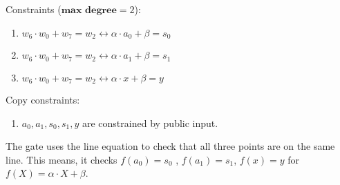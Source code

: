 Constraints ($\textbf{max degree} = 2$):
\begin{enumerate}
    \item $w_6 \cdot w_0 + w_7 = w_2 \longleftrightarrow 
            \alpha \cdot a_0 + \beta = s_0$
    \item $w_6 \cdot w_0 + w_7 = w_2 \longleftrightarrow 
            \alpha \cdot a_1 + \beta = s_1$
    \item $w_6 \cdot w_0 + w_7 = w_2 \longleftrightarrow 
            \alpha \cdot x + \beta = y$
\end{enumerate}

Copy constraints:
\begin{enumerate}
    \item $a_0, a_1, s_0, s_1, y$ are constrained by public input.
\end{enumerate}

The gate uses the line equation to check that all three points are on the same line.
This means, it checks $f(a_0) = s_0$ , $f(a_1) = s_1$, $f(x) = y$ for $f(X) = \alpha \cdot X + \beta$.
